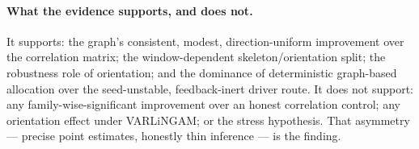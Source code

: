 \paragraph{What the evidence supports, and does not.} It supports: the
graph's consistent, modest, direction-uniform improvement over the
correlation matrix; the window-dependent skeleton/orientation split; the
robustness role of orientation; and the dominance of deterministic
graph-based allocation over the seed-unstable, feedback-inert driver route.
It does not support: any family-wise-significant improvement over an honest
correlation control; any orientation effect under VARLiNGAM; or the stress
hypothesis. That asymmetry --- precise point estimates, honestly thin
inference --- is the finding.
